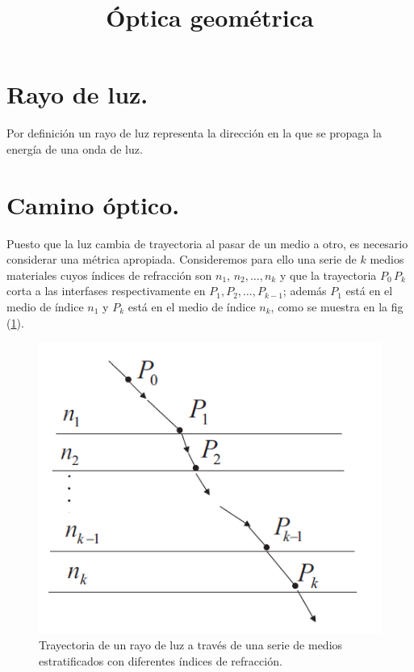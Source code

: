 \documentclass[14pt]{extarticle}
\title{\vspace*{-2cm}Óptica geométrica}
\date{ }
\begin{document}
\maketitle

\section{Rayo de luz.}

Por definición un rayo de luz representa la dirección en la que se propaga la energía de una onda de luz.

\section{Camino óptico.}

Puesto que la luz cambia de trayectoria al pasar de un medio a otro, es necesario considerar una métrica apropiada. Consideremos para ello una serie de $k$ medios materiales cuyos índices de refracción son $n_{1}$, $n_{2}, \ldots, n_{k}$ y que la trayectoria $P_{0} \, P_{k}$ corta a las interfases respectivamente en $P_{1}, P_{2}, \ldots, P_{k-1}$; además $P_{1}$ está en el medio de índice $n_{1}$ y $P_{k}$ está en el medio de índice $n_{k}$, como se muestra en la fig (\ref{fig:figura_01}).
\begin{figure}[H]
    \centering
    \includegraphics[scale=1]{Imagenes/Optica_Geometrica_01.png}
    \caption{Trayectoria de un rayo de luz a través de una serie de medios estratificados con diferentes
    índices de refracción.}
    \label{fig:figura_01}
\end{figure}
\end{document}
